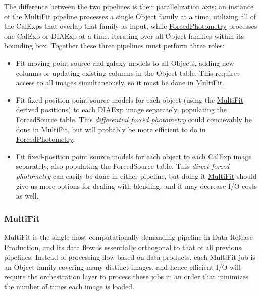 The difference between the two pipelines is their parallelization axis: an instance of the \hyperref[sec:drpMultiFit]{MultiFit} pipeline processes a single Object family at a time, utilizing all of the CalExps that overlap that family as input, while \hyperref[sec:drpForcedPhotometry]{ForcedPhotometry} processes one CalExp or DIAExp at a time, iterating over all Object families within its bounding box.  Together these three pipelines must perform three roles:
\begin{itemize}
\item Fit moving point source and galaxy models to all Objects, adding new columns or updating existing columns in the Object table.  This requires access to all images simultaneously, so it must be done in \hyperref[sec:drpMultiFit]{MultiFit}.
\item Fit fixed-position point source models for each object (using the \hyperref[sec:drpMultiFit]{MultiFit}-derived positions) to each DIAExp image separately, populating the ForcedSource table.  This \emph{differential forced photometry} could concievably be done in \hyperref[sec:drpMultiFit]{MultiFit}, but will probably be more efficient to do in \hyperref[sec:drpForcedPhotometry]{ForcedPhotometry}.
\item Fit fixed-position point source models for each object to each CalExp image separately, also populating the ForcedSource table.  This \emph{direct forced photometry} can easily be done in either pipeline, but doing it \hyperref[sec:drpMultiFit]{MultiFit} should give us more options for dealing with blending, and it may decrease I/O costs as well.
\end{itemize}

\subsubsection{MultiFit}
\label{sec:drpMultiFit}

MultiFit is the single most computationally demanding pipeline in Data Release Production, and its data flow is essentially orthogonal to that of all previous pipelines.  Instead of processing flow based on data products, each MultiFit job is an Object family covering many distinct images, and hence efficient I/O will require the orchestration layer to process these jobs in an order that minimizes the number of times each image is loaded.

